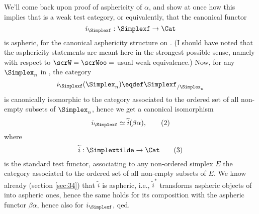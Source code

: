 We'll come back upon proof of asphericity of $\alpha$, and show at
once how this implies that \Simplexf{} is a weak test category, or
equivalently, that the canonical functor
\[i_\Simplexf : \Simplexf\to\Cat\]
is aspheric, for the canonical asphericity structure on \Cat. (I
should have noted that the asphericity statements are meant here in
the strongest possible sense, namely with respect to $\scrW=\scrWoo=$
usual weak equivalence.) Now, for any $\Simplex_n$ in \Simplexf, the
category
\[ i_\Simplexf(\Simplex_n) \eqdef \Simplexf_{/\Simplex_n}\]
is canonically isomorphic to the category associated to the ordered
set of all non-empty subsets of $\Simplex_n$, hence we get a canonical
isomorphism
\begin{equation}
  \label{eq:98.2}
  i_\Simplexf \simeq \widetilde i(\beta\alpha),\tag{2}
\end{equation}
where
\begin{equation}
  \label{eq:98.3}
  \widetilde i:\Simplextilde\to\Cat\tag{3}
\end{equation}
is the standard test functor, associating to any non-ordered simplex
$E$ the category associated to the ordered set of all non-empty
subsets of $E$. We know already (section \ref{sec:34}) that
$\widetilde i$ is aspheric, i.e., $\widetilde i^*$ transforms aspheric
objects of \Cat{} into aspheric ones, hence the same holds for its
composition with the aspheric functor $\beta\alpha$, hence also for
$i_\Simplexf$, qed.

